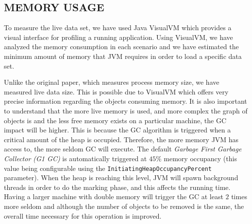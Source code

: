 \documentclass[a4paper,twoside]{article}
\begin{document}






\subsection{\uppercase{Memory Usage}}
To measure the live data set, we have used Java VisualVM \cite{visualvm:oracle} which provides a visual interface for profiling a running application. Using VisualVM, we have analyzed the memory consumption in each scenario and we have estimated the minimum amount of memory that JVM requires in order to load a specific data set.

Unlike the original paper, which measures process memory size, we have measured live data size.  This is possible due to VisualVM which offers very precise information regarding the objects consuming memory.
It is also important to understand that the more live memory is used, and more complex the graph of objects is and the less free memory exists on a particular machine, the GC impact will be higher.
This is because the GC algorithm is triggered when a critical amount of the heap is occupied.
Therefore, the more memory JVM has access to, the more seldom GC will execute.
The default {\it Garbage First Garbage Collector (G1 GC)} is automatically triggered at $45\%$ memory occupancy (this value being configurable using the \texttt{InitiatingHeapOccupancyPercent} parameter). When the heap is reaching this level, JVM will spawn background threads in order to do the marking phase, and this affects the running time.
Having a larger machine with double memory will trigger the GC at least $2$ times more seldom and
although the number of objects to be removed is the same, the overall time necessary for this operation is improved.
\end{document}
